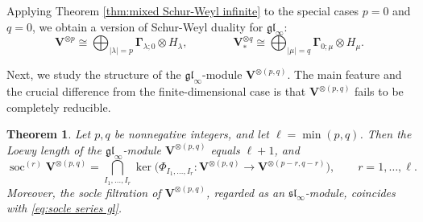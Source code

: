 \documentclass[12pt,reqno]{amsart}
\numberwithin{equation}{section}
\theoremstyle{plain}
\newtheorem{thm}{Theorem}[section]
\theoremstyle{definition}
\def\gl{\mathfrak{gl}}
\def\sl{\mathfrak{sl}}
\def\soc{\operatorname{soc}}
\def\o{\otimes}
\def\glV_#1{\boldsymbol\Gamma_{#1}}
\def\VV{\mathbf V}
\begin{document}
\medskip



Applying Theorem \ref{thm:mixed Schur-Weyl infinite} to the special
cases $p=0$ and $q=0$, we obtain a version of Schur-Weyl duality for
$\gl_\infty$:
\begin{equation}\label{eq:Schur-Weyl infinite}
    \VV^{\o p} \cong \bigoplus_{|\lambda| = p}
    \glV_{\lambda;0} \o H_\lambda,
    \qquad\qquad
    \VV_*^{\o q} \cong \bigoplus_{|\mu| = q}
    \glV_{0;\mu} \o H_\mu.
\end{equation}





Next, we study the structure of the $\gl_\infty$-module
$\VV^{\o(p,q)}$. The main feature and the crucial difference from
the finite-dimensional case is that $\VV^{\o(p,q)}$ fails to be
completely reducible.



\begin{thm}\label{thm:socle series gl}
Let $p,q$ be nonnegative integers, and let $\ell = \min(p,q)$. Then
the Loewy length of the $\gl_\infty$-module $\VV^{\o (p,q)}$ equals
$\ell+1$, and
\begin{equation}\label{eq:socle series gl}
    \soc^{(r)} \VV^{\o(p,q)} = \bigcap_{I_1,\dots,I_r} \ker
    \biggr( \Phi_{I_1,\dots,I_r}: \VV^{\o(p,q)} \to
    \VV^{\o(p-r,q-r)}\biggr),
    \qquad
    r=1,\dots,\ell.
\end{equation}
Moreover, the socle filtration of $\VV^{\o (p,q)}$, regarded as an
$\sl_\infty$-module, coincides with \eqref{eq:socle series gl}.
\end{thm}
\end{document}
